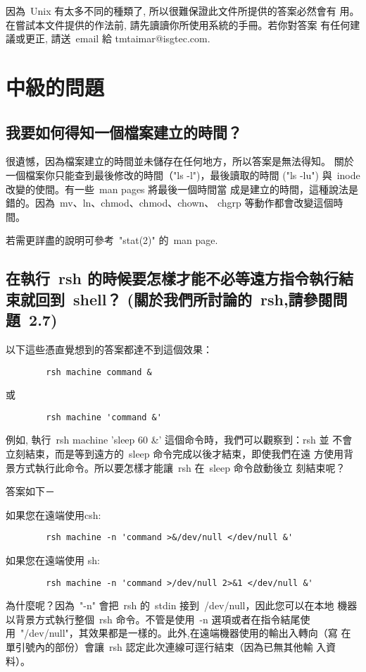 \documentclass{article}
\begin{document}
\begin{CJK*}{Bg5}{ming}
因為~Unix 有太多不同的種類了, 所以很難保證此文件所提供的答案必然會有
用。在嘗試本文件提供的作法前, 請先讀讀你所使用系統的手冊。若你對答案
有任何建議或更正, 請送~email 給 tmtaimar@isgtec.com.

\setcounter{section}{2}
\section{中級的問題}
\subsection{我要如何得知一個檔案建立的時間？}

	很遺憾，因為檔案建立的時間並未儲存在任何地方，所以答案是無法得知。
	關於一個檔案你只能查到最後修改的時間（"ls -l")，最後讀取的時間
        ("ls -lu") 與~inode 改變的使間。有一些~man pages 將最後一個時間當
        成是建立的時間，這種說法是錯的。因為~mv、ln、chmod、chmod、chown、
        chgrp 等動作都會改變這個時間。

	若需更詳盡的說明可參考~"stat(2)" 的~man page.

\subsection{在執行~rsh 的時候要怎樣才能不必等遠方指令執行結束就回到~shell？
        (關於我們所討論的~rsh,請參閱問題~2.7)}

	以下這些憑直覺想到的答案都達不到這個效果：
\begin{verbatim}
		rsh machine command &
\end{verbatim}
	或	
\begin{verbatim}
		rsh machine 'command &'
\end{verbatim}
	例如, 執行~rsh machine 'sleep 60 \&' 這個命令時，我們可以觀察到：rsh 並
	不會立刻結束，而是等到遠方的~sleep 命令完成以後才結束，即使我們在遠
	方使用背景方式執行此命令。所以要怎樣才能讓~rsh 在~sleep 命令啟動後立
	刻結束呢？

	答案如下－

	如果您在遠端使用csh:
\begin{verbatim}
		rsh machine -n 'command >&/dev/null </dev/null &'
\end{verbatim}

	如果您在遠端使用 sh:
\begin{verbatim}
		rsh machine -n 'command >/dev/null 2>&1 </dev/null &'
\end{verbatim}

	為什麼呢？因為~"-n" 會把~rsh 的~stdin 接到~/dev/null，因此您可以在本地
	機器以背景方式執行整個~rsh 命令。不管是使用~-n 選項或者在指令結尾使
	用~"/dev/null"，其效果都是一樣的。此外,在遠端機器使用的輸出入轉向（寫
	在單引號內的部份）會讓~rsh 認定此次連線可逕行結束（因為已無其他輸
	入資料）。


\end{CJK*}
\end{document}

